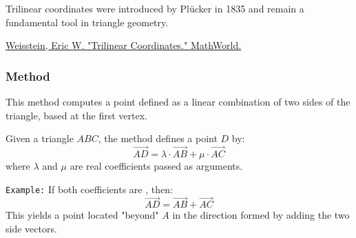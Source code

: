 \medskip

Trilinear coordinates were introduced by Plücker in 1835 and remain a fundamental tool in triangle geometry.
\begin{flushright}
\small
\href{https://mathworld.wolfram.com/TrilinearCoordinates.html}{Weisstein, Eric W. "Trilinear Coordinates." MathWorld.}
\end{flushright}

\vspace{1em}
\begin{tkzexample}[latex=.5\textwidth]
\begin{center}
\end{center}
\end{tkzexample}

\subsubsection{Method } %
\label{ssub:method_triangle_base}

This method computes a point defined as a linear combination of two sides of the triangle, based at the first vertex.

\medskip

Given a triangle $ABC$, the method defines a point $D$ by:
\[
\overrightarrow{AD} = \lambda \cdot \overrightarrow{AB} + \mu \cdot \overrightarrow{AC}
\]
where $\lambda$ and $\mu$ are real coefficients passed as arguments.

\medskip

\texttt{Example:} If both coefficients are , then:
\[
\overrightarrow{AD} = \overrightarrow{AB} + \overrightarrow{AC}
\]
This yields a point located "beyond" $A$ in the direction formed by adding the two side vectors.

\begin{mybox}
\end{mybox}

\vspace{1em}

